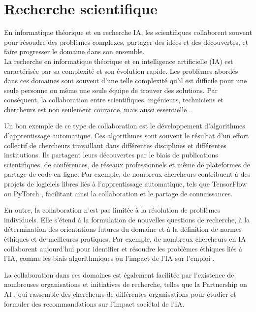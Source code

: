 \section{Recherche scientifique}
En informatique théorique et en recherche IA, les scientifiques collaborent souvent pour résoudre des problèmes complexes, partager des idées et des découvertes, et faire progresser le domaine dans son ensemble.\\
La recherche en informatique théorique et en intelligence artificielle (IA) est caractérisée par sa complexité et son évolution rapide. Les problèmes abordés dans ces domaines sont souvent d'une telle complexité qu'il est difficile pour une seule personne ou même une seule équipe de trouver des solutions. Par conséquent, la collaboration entre scientifiques, ingénieurs, techniciens et chercheurs est non seulement courante, mais aussi essentielle \cite{gupta_collaborative_2019}.

Un bon exemple de ce type de collaboration est le développement d'algorithmes d'apprentissage automatique. Ces algorithmes sont souvent le résultat d'un effort collectif de chercheurs travaillant dans différentes disciplines et différentes institutions. Ils partagent leurs découvertes par le biais de publications scientifiques, de conférences, de réseaux professionnels et même de plateformes de partage de code en ligne. Par exemple, de nombreux chercheurs contribuent à des projets de logiciels libres liés à l'apprentissage automatique, tels que TensorFlow \cite{abadi_tensorflow:_2016} ou PyTorch \cite{paszke_pytorch:_2019}, facilitant ainsi la collaboration et le partage de connaissances.

En outre, la collaboration n'est pas limitée à la résolution de problèmes individuels. Elle s'étend à la formulation de nouvelles questions de recherche, à la détermination des orientations futures du domaine et à la définition de normes éthiques et de meilleures pratiques. Par exemple, de nombreux chercheurs en IA collaborent aujourd'hui pour identifier et résoudre les problèmes éthiques liés à l'IA, comme les biais algorithmiques ou l'impact de l'IA sur l'emploi \cite{jobin_artificial_2019}.

La collaboration dans ces domaines est également facilitée par l'existence de nombreuses organisations et initiatives de recherche, telles que la Partnership on AI \cite{partnership_on_ai}, qui rassemble des chercheurs de différentes organisations pour étudier et formuler des recommandations sur l'impact sociétal de l'IA.

